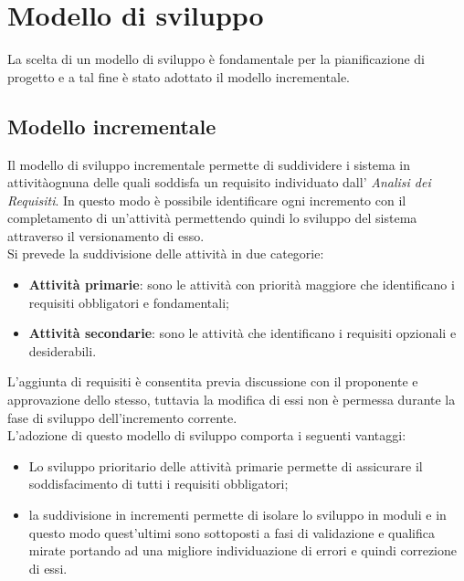 \section{Modello di sviluppo}
La scelta di un modello di sviluppo è fondamentale per la pianificazione di 
progetto e a tal fine è stato adottato il modello incrementale.
\subsection{Modello incrementale}
Il modello di sviluppo incrementale permette di suddividere i sistema in 
attività\glosp ognuna delle quali soddisfa un requisito\glosp 
individuato dall' \textit{Analisi dei Requisiti}. In questo modo è possibile 
identificare ogni incremento con il completamento di un'attività permettendo 
quindi lo sviluppo del sistema attraverso il versionamento di esso. \\
Si prevede la suddivisione delle attività in due categorie: 
\begin{itemize}
	\item \textbf{Attività primarie}: sono le attività con priorità maggiore 
	che identificano i requisiti obbligatori e fondamentali;
	\item \textbf{Attività secondarie}: sono le attività che identificano i 
	requisiti opzionali e desiderabili.
\end{itemize}
L'aggiunta di requisiti è consentita previa discussione con il proponente e 
approvazione dello stesso, tuttavia la modifica di essi non è permessa 
durante la fase di sviluppo dell'incremento corrente.\\
L'adozione di questo modello di sviluppo comporta i seguenti vantaggi:
\begin{itemize}
	\item Lo sviluppo prioritario delle attività primarie permette di 
	assicurare il soddisfacimento di tutti i requisiti obbligatori;
	\item la suddivisione in incrementi permette di isolare lo sviluppo in 
	moduli e in questo modo quest'ultimi sono sottoposti a fasi di validazione 
	e qualifica mirate portando ad una migliore individuazione di errori e 
	quindi correzione di essi.
\end{itemize}

